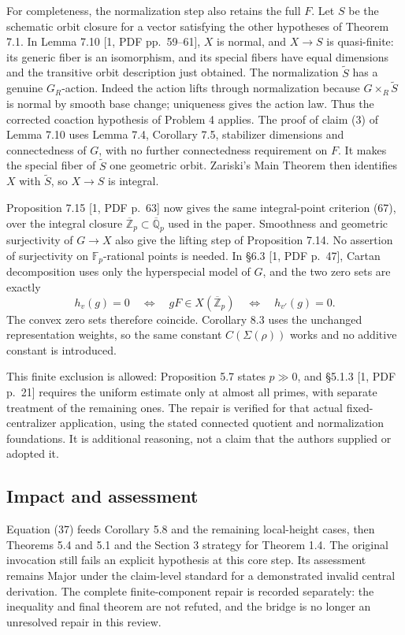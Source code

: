 \documentclass[10pt]{article}
\begin{document}
For completeness, the normalization step also retains the full \(F\). Let \(S\) be the schematic orbit closure for a vector satisfying the other hypotheses of Theorem 7.1. In Lemma 7.10 [1, PDF pp. 59–61], \(X\) is normal, and \(X\to S\) is quasi-finite: its generic fiber is an isomorphism, and its special fibers have equal dimensions and the transitive orbit description just obtained. The normalization \(\widetilde S\) has a genuine \(G_R\)-action. Indeed the action lifts through normalization because \(G\times_R\widetilde S\) is normal by smooth base change; uniqueness gives the action law. Thus the corrected coaction hypothesis of Problem 4 applies. The proof of claim (3) of Lemma 7.10 uses Lemma 7.4, Corollary 7.5, stabilizer dimensions and connectedness of \(G\), with no further connectedness requirement on \(F\). It makes the special fiber of \(\widetilde S\) one geometric orbit. Zariski’s Main Theorem then identifies \(X\) with \(\widetilde S\), so \(X\to S\) is integral.\par
Proposition 7.15 [1, PDF p. 63] now gives the same integral-point criterion (67), over the integral closure \(\overline{\mathbb Z}_p\subset\overline{\mathbb Q}_p\) used in the paper. Smoothness and geometric surjectivity of \(G\to X\) also give the lifting step of Proposition 7.14. No assertion of surjectivity on \(\mathbb F_p\)-rational points is needed. In §6.3 [1, PDF p. 47], Cartan decomposition uses only the hyperspecial model of \(G\), and the two zero sets are exactly \[h_v(g)=0\quad\Longleftrightarrow\quad
 gF\in X(\overline{\mathbb Z}_p)
 \quad\Longleftrightarrow\quad h_{v'}(g)=0.\] The convex zero sets therefore coincide. Corollary 8.3 uses the unchanged representation weights, so the same constant \(C(\Sigma(\rho))\) works and no additive constant is introduced.\par
This finite exclusion is allowed: Proposition 5.7 states \(p\gg0\), and §5.1.3 [1, PDF p. 21] requires the uniform estimate only at almost all primes, with separate treatment of the remaining ones. The repair is verified for that actual fixed-centralizer application, using the stated connected quotient and normalization foundations. It is additional reasoning, not a claim that the authors supplied or adopted it.\par
\subsection*{Impact and assessment}
Equation (37) feeds Corollary 5.8 and the remaining local-height cases, then Theorems 5.4 and 5.1 and the Section 3 strategy for Theorem 1.4. The original invocation still fails an explicit hypothesis at this core step. Its assessment remains Major under the claim-level standard for a demonstrated invalid central derivation. The complete finite-component repair is recorded separately: the inequality and final theorem are not refuted, and the bridge is no longer an unresolved repair in this review.\par
\end{document}
